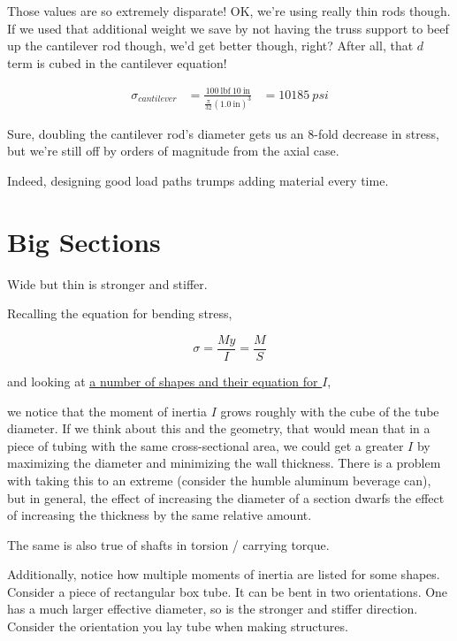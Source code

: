 Those values are so extremely disparate! OK, we're using really thin rods though. If we used that additional weight we save by not having the truss support to beef up the cantilever rod though, we'd get better though, right? After all, that $d$ term is cubed in the cantilever equation!

\begin{align}
	\sigma_{cantilever} &= \frac{100 \ \mbox{lbf} \ 10 \ \mbox{in}}{\frac{\pi}{32} (1.0 \ \mbox{in})^3} &= 10185 \ psi
\end{align}

Sure, doubling the cantilever rod's diameter gets us an 8-fold decrease in stress, but we're still off by orders of magnitude from the axial case.

Indeed, designing good load paths trumps adding material every time.

\section{Big Sections}
\begin{theorem} \label{theorem:big_sections}
Wide but thin is stronger and stiffer.
\end{theorem}

Recalling the equation for bending stress,

\begin{equation*}
	\sigma = \frac{M y}{I} = \frac{M}{S}
\end{equation*}

and looking at \href{https://en.wikipedia.org/wiki/List_of_second_moments_of_area}{\color{red}\underline{a number of shapes and their equation for $I$}},

 we notice that the moment of inertia $I$ grows roughly with the cube of the tube diameter. If we think about this and the geometry, that would mean that in a piece of tubing with the same cross-sectional area, we could get a greater $I$ by maximizing the diameter and minimizing the wall thickness. There is a problem with taking this to an extreme (consider the humble aluminum beverage can), but in general, the effect of increasing the diameter of a section dwarfs the effect of increasing the thickness by the same relative amount.

The same is also true of shafts in torsion / carrying torque.

Additionally, notice how multiple moments of inertia are listed for some shapes. Consider a piece of rectangular box tube. It can be bent in two orientations. One has a much larger effective diameter, so is the stronger and stiffer direction. Consider the orientation you lay tube when making structures.

